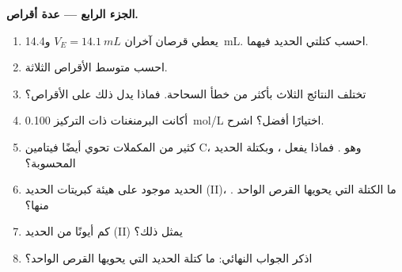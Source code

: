 \begin{problem}
\medskip
\noindent\textbf{الجزء الرابع --- عدة أقراص.}
\begin{enumerate}[resume]
  \item يعطي قرصان آخران $V_E = \qty{14.1}{mL}$
        و\qty{14.4}{mL}. احسب كتلتي الحديد فيهما.
  \item احسب متوسط الأقراص الثلاثة.
  \item تختلف النتائج الثلاث بأكثر من خطأ السحاحة. فماذا
        يدل ذلك على الأقراص؟
  \item أكانت البرمنغنات ذات التركيز \qty{0.100}{mol/L} اختيارًا
        أفضل؟ اشرح.
  \item كثير من المكملات تحوي أيضًا فيتامين C، وهو . فماذا
        يفعل ، وبكتلة الحديد المحسوبة؟
  \item الحديد موجود على هيئة كبريتات الحديد (II)، . ما الكتلة
        التي يحويها القرص الواحد منها؟
  \item كم أيونًا من الحديد (II) يمثل ذلك؟
  \item اذكر الجواب النهائي: ما كتلة الحديد التي يحويها القرص
        الواحد؟
\end{enumerate}
\end{problem}
